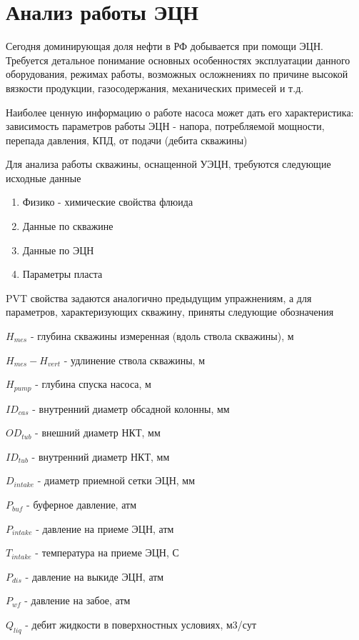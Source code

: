
\section{Анализ работы ЭЦН}

Сегодня доминирующая доля нефти в РФ добывается при помощи ЭЦН. Требуется детальное понимание основных особенностях эксплуатации данного оборудования, режимах работы, возможных осложнениях по причине высокой вязкости продукции, газосодержания, механических примесей и т.д.

Наиболее ценную информацию о работе насоса может дать его характеристика: зависимость параметров работы ЭЦН - напора, потребляемой мощности, перепада давления, КПД, от подачи (дебита скважины)

Для анализа работы скважины, оснащенной УЭЦН, требуются следующие исходные данные

\begin{enumerate}
	\item Физико - химические свойства флюида
	\item Данные по скважине
	\item Данные по ЭЦН
	\item Параметры пласта
\end{enumerate}

PVT свойства задаются аналогично предыдущим упражнениям, а для параметров, характеризующих скважину, приняты следующие обозначения

$H_{mes}$ - глубина скважины измеренная (вдоль ствола скважины), м

$H_{mes}- H_{vert}$ - удлинение ствола скважины, м

$H_{pump}$ - глубина спуска насоса, м

$ID_{cas}$ - внутренний диаметр обсадной колонны, мм

$OD_{tub}$ - внешний диаметр НКТ, мм

$ID_{tub}$ - внутренний диаметр НКТ, мм

$D_{intake}$ - диаметр приемной сетки ЭЦН, мм

$P_{buf}$ - буферное давление, атм

$P_{intake}$ - давление на приеме ЭЦН, атм

$T_{intake}$ - температура на приеме ЭЦН, С

$P_{dis}$ - давление на выкиде ЭЦН, атм

$P_{wf}$ - давление на забое, атм

$Q_{liq}$ - дебит жидкости в поверхностных условиях, м3/сут

